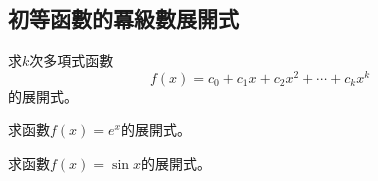 \documentclass[a4paper,12pt]{article}
\theoremstyle{theorem}
\begin{document}
\begin{CJK*}{UTF8}{bsmi}
    \subsection{初等函數的冪級數展開式}
    \begin{example}
        求$k$次多項式函數
        \[
            f(x) = c_0 + c_1 x + c_2 x^2 + \cdots + c_k x^k
        \]
        的展開式。
    \end{example}

    \begin{example}
        求函數$\displaystyle f(x) = e^x$的展開式。
    \end{example}

    \begin{example}
        求函數$\displaystyle f(x) = \sin x$的展開式。
    \end{example}


\end{CJK*}
\end{document}
